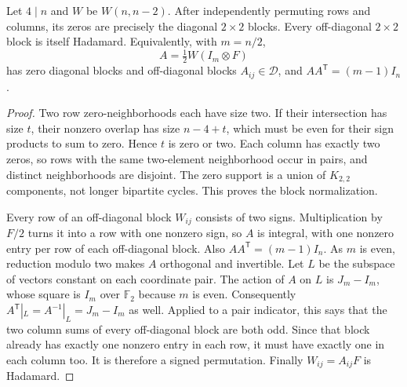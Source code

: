 \begin{theorem}
Let $4\mid n$ and $W$ be $W(n,n-2)$. After independently permuting
rows and columns, its zeros are precisely the diagonal $2\times2$
blocks. Every off-diagonal $2\times2$ block is itself Hadamard.
Equivalently, with $m=n/2$,
\[
 A=\tfrac12W(I_m\otimes F)
\]
has zero diagonal blocks and off-diagonal blocks $A_{ij}\in\mathcal D$,
and $AA^{\mathsf T}=(m-1)I_n$.
\end{theorem}
\begin{proof}
Two row zero-neighborhoods each have size two. If their intersection
has size $t$, their nonzero overlap has size $n-4+t$, which must be
even for their sign products to sum to zero. Hence $t$ is zero or
two. Each column has exactly two zeros, so rows with the same
two-element neighborhood occur in pairs, and distinct neighborhoods
are disjoint. The zero support is a union of $K_{2,2}$ components,
not longer bipartite cycles. This proves the block normalization.

Every row of an off-diagonal block $W_{ij}$ consists of two signs.
Multiplication by $F/2$ turns it into a row with one nonzero sign,
so $A$ is integral, with one nonzero entry per row of each
off-diagonal block. Also $AA^{\mathsf T}=(m-1)I_n$.
As $m$ is even, reduction modulo two makes $A$ orthogonal and
invertible. Let $L$ be the subspace of vectors constant on each
coordinate pair. The action of $A$ on $L$ is $J_m-I_m$, whose
square is $I_m$ over $\mathbb F_2$ because $m$ is even.
Consequently $A^{\mathsf T}|_L=A^{-1}|_L=J_m-I_m$ as well.
Applied to a pair indicator, this says that the two column sums
of every off-diagonal block are both odd. Since that block already
has exactly one nonzero entry in each row, it must have exactly
one in each column too. It is therefore a signed permutation.
Finally $W_{ij}=A_{ij}F$ is Hadamard.
\end{proof}

